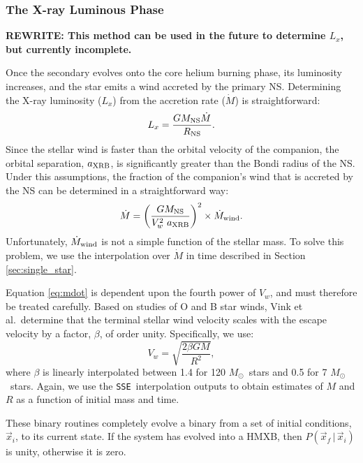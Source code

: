 \documentclass[12pt, preprint]{aastex}
\newcommand{\given}{\,|\,}
\newcommand{\Msun}{\ifmmode {M_{\odot}}\else${M_{\odot}}$\fi}
\newcommand{\sse}{{\tt SSE}}
\begin{document}
\subsubsection{The X-ray Luminous Phase} \label{sec:trans_XRB}

{\bf REWRITE: This method can be used in the future to determine $L_x$, but currently incomplete.}

Once the secondary evolves onto the core helium burning phase, its luminosity increases, and the star emits a wind accreted by the primary NS. Determining the X-ray luminosity ($L_x$) from the accretion rate ($\dot{M}$) is straightforward: 
\begin{equation}
L_x = \frac{G M_{\rm NS} \dot{M}}{R_{\rm NS}}.
\end{equation}
Since the stellar wind is faster than the orbital velocity of the companion, the orbital separation, $a_{\rm XRB}$, is significantly greater than the Bondi radius of the NS. Under this assumptions, the fraction of the companion's wind that is accreted by the NS can be determined in a straightforward way:
\begin{equation}
\dot{M} = \left( \frac{G M_{\rm NS}}{V_w^2\ a_{\rm XRB}} \right)^2 \times \dot{M}_{\rm wind}. \label{eq:mdot}
\end{equation}
Unfortunately, $\dot{M}_{\rm wind}$ is not a simple function of the stellar mass. To solve this problem, we use the interpolation over $\dot{M}$ in time described in Section \ref{sec:single_star}. 

Equation \ref{eq:mdot} is dependent upon the fourth power of $V_w$, and must therefore be treated carefully. Based on studies of O and B star winds, Vink et al.\ determine that the terminal stellar wind velocity scales with the escape velocity by a factor, $\beta$, of order unity. Specifically, we use:
\begin{equation}
V_w = \sqrt{\frac{2 \beta G M}{R^2}},
\end{equation}
where $\beta$ is linearly interpolated between 1.4 for 120 \Msun\ stars and 0.5 for 7 \Msun\ stars. Again, we use the \sse\ interpolation outputs to obtain estimates of $M$ and $R$ as a function of initial mass and time.

These binary routines completely evolve a binary from a set of initial conditions, $\vec{x}_i$, to its current state. If the system has evolved into a HMXB, then $P(\vec{x}_f \given \vec{x}_i)$ is unity, otherwise it is zero.
\end{document}
